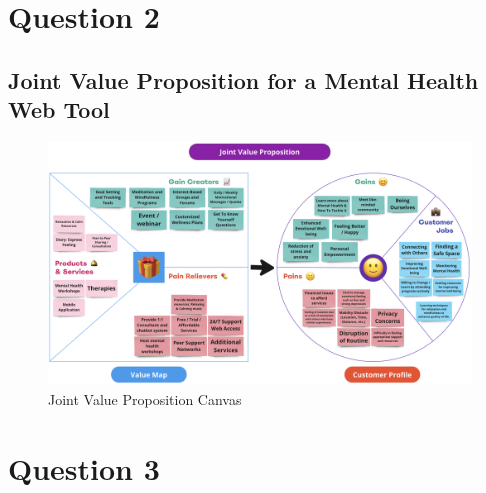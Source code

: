 \documentclass[12pt,a4paper]{article}
\begin{document}
\pagebreak%

\setcounter{page}{3}

\section{Question 2}
\subsection{Joint Value Proposition for a Mental Health Web Tool}
\label{sec:Question 2}

\begin{figure}[htbp]
    \centering
    \includegraphics[width=1\textwidth]{images/JointValue.png}
    \caption{Joint Value Proposition Canvas}
    \label{fig:example}
\end{figure}

\noindent{}


\pagebreak

\setcounter{page}{4}

\section{Question 3}
\end{document}
